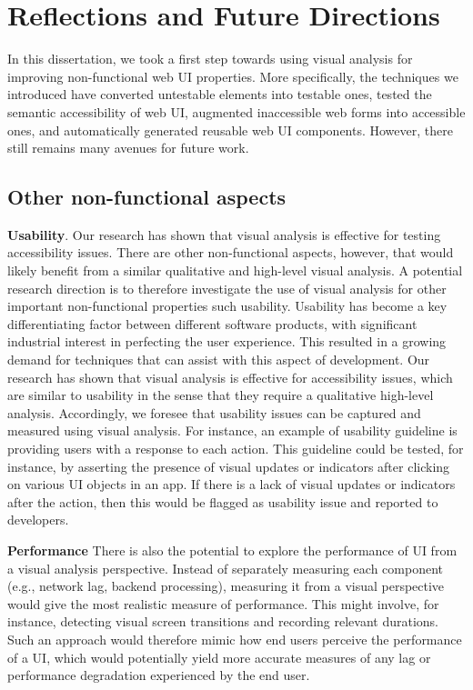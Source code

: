 \section{Reflections and Future Directions}
In this dissertation, we took a first step towards using visual analysis for 
improving non-functional web UI properties. More specifically, the techniques 
we introduced have converted untestable elements into testable ones, tested 
the semantic accessibility of web UI, augmented inaccessible web forms into 
accessible ones, and automatically generated reusable web UI components. 
However, there still remains many avenues for future work.


\stoptocentries

\subsection{Other non-functional aspects} 

{\textbf{Usability}.} 
Our research has shown that visual analysis is effective for testing accessibility issues. 
There are other non-functional aspects, however, that would likely benefit from a similar 
qualitative and high-level visual analysis. A potential research direction is to therefore 
investigate the use of visual analysis for other important non-functional properties such 
usability. Usability has become a key differentiating factor between different software 
products, with significant industrial interest in perfecting the user experience. This resulted in a growing demand for techniques that can assist with this aspect of development. 
Our research has shown that visual analysis is 
effective for accessibility issues, which are similar to usability in the sense that they require a qualitative high-level analysis.  
Accordingly, we foresee that usability issues can be captured and measured using visual analysis. For instance, an example of usability guideline is  providing users with a response to each action. This guideline could be tested, for instance, by asserting the presence of visual updates or indicators after clicking on various UI objects in an app. If there is a lack of visual updates or indicators after the action, then this would be flagged as usability issue and reported to developers.  


{\textbf{Performance}}
There is also the potential to explore the performance of UI from a visual analysis 
perspective. Instead of separately measuring each component (e.g., network lag, backend 
processing), measuring it from a visual perspective would give the most realistic measure 
of performance. This might involve, for instance, detecting visual screen transitions 
and recording relevant durations. Such an approach would therefore mimic how end users 
perceive the performance of a UI, which would potentially yield more accurate measures of 
any lag or performance degradation experienced by the end user.    

